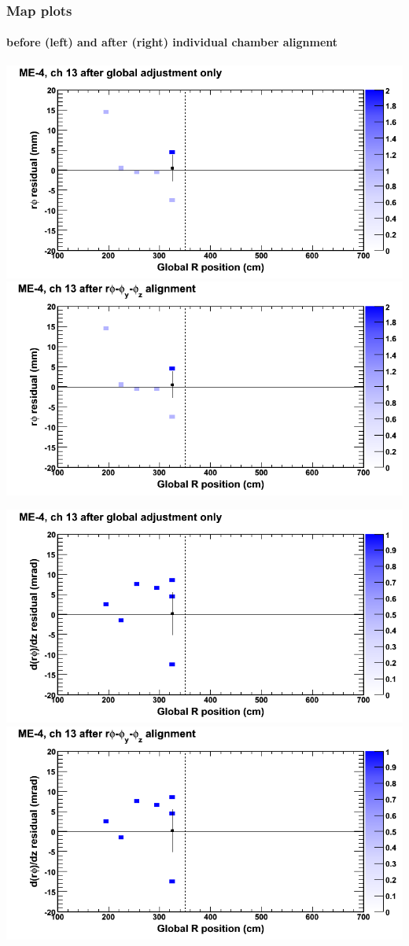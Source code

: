 \documentclass[compress]{beamer}
\begin{document}
\begin{frame}
\frametitle{Map plots}
\framesubtitle{before (left) and after (right) individual chamber alignment}
\includegraphics[width=0.5\linewidth]{ringmapplots_3dof/before_CSCvsr_mem4ch13_x.png} \includegraphics[width=0.5\linewidth]{ringmapplots_3dof/after_CSCvsr_mem4ch13_x.png}

\includegraphics[width=0.5\linewidth]{ringmapplots_3dof/before_CSCvsr_mem4ch13_dxdz.png} \includegraphics[width=0.5\linewidth]{ringmapplots_3dof/after_CSCvsr_mem4ch13_dxdz.png}
\end{frame}
\end{document}
